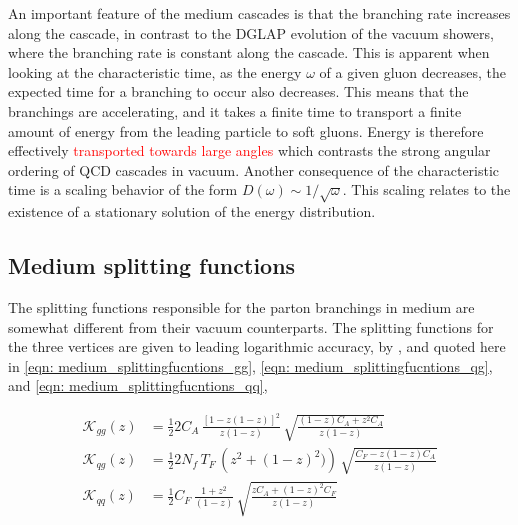\documentclass[main.tex]{subfiles}
\begin{document}
An important feature of the medium cascades is that the branching rate increases along the cascade, in contrast to the DGLAP evolution of the vacuum showers, where the branching rate is constant along the cascade. This is apparent when looking at the characteristic time, as the energy \(\omega\) of a given gluon decreases, the expected time for a branching to occur also decreases. This means that the branchings are accelerating, and it takes a finite time to transport a finite amount of energy from the leading particle to soft gluons. Energy is therefore effectively \textcolor{red}{transported towards large angles} which contrasts the strong angular ordering of QCD cascades in vacuum. Another consequence of the characteristic time is a scaling behavior of the form \(D(\omega) \sim 1/\sqrt{\omega} \). This scaling relates to the existence of a stationary solution of the energy distribution. 

\subsection{Medium splitting functions}
The splitting functions responsible for the parton branchings in medium are somewhat different from their vacuum counterparts. The splitting functions for the three vertices are given to leading logarithmic accuracy, by \cite{Universal_quark_gluon_ratio_in_medium-induced_parton_cascade}, and quoted here in \autoref{eqn: medium_splittingfucntions_gg}, \autoref{eqn: medium_splittingfucntions_qg}, and \autoref{eqn: medium_splittingfucntions_qq},

\begin{align}
    \mathcal{K}_{gg}(z) &= \frac{1}{2} 2 C_A \, \frac{[1-z(1-z)]^2}{z(1-z)} \, \sqrt{\frac{(1-z)C_A + z^2 C_A}{z(1-z)}} \label{eqn: medium_splittingfucntions_gg} \\
    \mathcal{K}_{qg}(z) &= \frac{1}{2} 2 N_f \, T_F \, \left(z^2 +(1-z)^2)\right) \, \sqrt{\frac{C_F - z(1-z)C_A}{z(1-z)}} \label{eqn: medium_splittingfucntions_qg} \\
    \mathcal{K}_{qq}(z) &= \frac{1}{2} C_F \, \frac{1+z^2}{(1-z)} \, \sqrt{\frac{zC_A + (1-z)^2 C_F}{z(1-z)}} \label{eqn: medium_splittingfucntions_qq}
\end{align}
\end{document}
